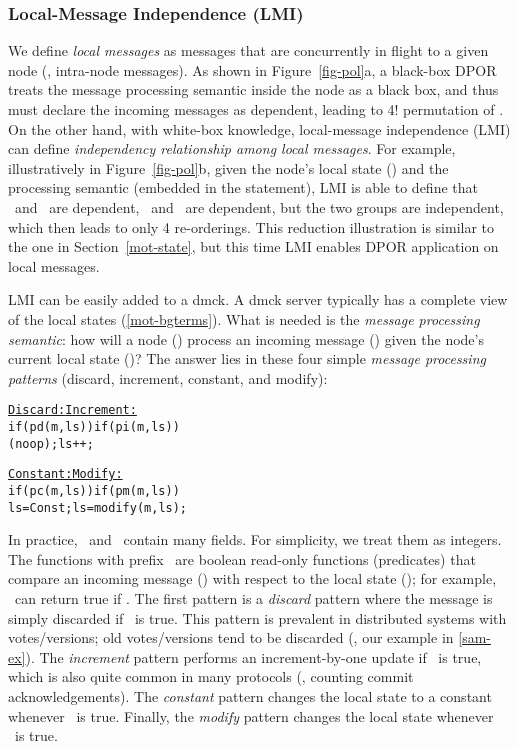 
\subsubsection{Local-Message Independence (LMI)}
\label{sam-lmi}

We define {\em local messages} as messages that are concurrently in
flight to a given node (\ie, intra-node messages).  As shown in
Figure~\ref{fig-pol}a, a black-box DPOR treats the message processing
semantic inside the node as a black box, and thus must declare the
incoming messages as dependent, leading to 4! permutation
of \ma\mb\mc\md.  On the other hand, with white-box knowledge,
local-message independence (LMI) can define {\em independency
relationship among local messages}.  For example, illustratively in
Figure~\ref{fig-pol}b, given the node's local state (\ls) and the
processing semantic (embedded in the  statement), LMI is able
to define that \ma\ and \mb\ are dependent, \mc\ and \md\ are
dependent, but the two groups are independent, which then leads to
only 4 re-orderings.  This reduction illustration is similar to the
one in Section~\ref{mot-state}, but this time LMI enables DPOR
application on local messages.


LMI can be easily added to a dmck.  A dmck server typically has a
complete view of the local states (\sec\ref{mot-bgterms}).  What is
needed is the {\em message processing semantic}: how will a node (\nn)
process an incoming message (\mm) given the node's current local state
(\ls)?  The answer lies in these four simple {\em message processing
patterns} (discard, increment, constant, and modify):

\begin{minipage}{\textwidth}
\begin{alltt}
\vfive
     \underline{Discard:}           \underline{Increment:}  
     if (pd(m,ls))      if (pi(m,ls))
      (noop);             ls++;       

     \underline{Constant:}          \underline{Modify:}  
     if (pc(m,ls))      if (pm(m,ls))
       ls = Const;        ls = modify(m,ls);
\end{alltt}
\vfive
\end{minipage}

In practice, \ls\ and \mm\ contain many fields.  For simplicity, we
treat them as integers.  The functions with prefix \pp\ are boolean
read-only functions (predicates) that compare an incoming message
(\mm) with respect to the local state (\ls); for example, \pd\ can
return true if .  The first pattern is a {\em discard} pattern
where the message is simply discarded if \pd\ is true.  This pattern
is prevalent in distributed systems with votes/versions; old
votes/versions tend to be discarded (\eg, our example
in \sec\ref{sam-ex}).  The {\em increment} pattern performs an
increment-by-one update if \pi\ is true, which is also quite common in
many protocols (\eg, counting commit acknowledgements).  The {\em
constant} pattern changes the local state to a constant whenever \pc\
is true.  Finally, the {\em modify} pattern changes the local state
whenever \pm\ is true.


